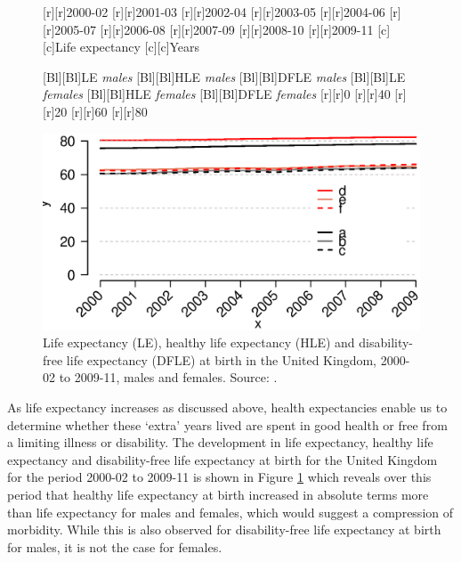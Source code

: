 \documentclass[11 pt, a4paper]{report}
\begin{document}
\begin{figure}[hbtp!]
[r][r]{\small{2000-02}}
[r][r]{\small{2001-03}}
[r][r]{\small{2002-04}}
[r][r]{\small{2003-05}}
[r][r]{\small{2004-06}}
[r][r]{\small{2005-07}}
[r][r]{\small{2006-08}}
[r][r]{\small{2007-09}}
[r][r]{\small{2008-10}}
[r][r]{\small{2009-11}}
[c][c]{\small{Life expectancy}}
[c][c]{\small{Years}}

[Bl][Bl]{\small{LE \emph{males}}}
[Bl][Bl]{\small{HLE \emph{males}}}
[Bl][Bl]{\small{DFLE \emph{males}}}
[Bl][Bl]{\small{LE \emph{females}}}
[Bl][Bl]{\small{HLE \emph{females}}}
[Bl][Bl]{\small{DFLE \emph{females}}}
[r][r]{\small{0}}
[r][r]{\small{40}}
[r][r]{\small{20}}
[r][r]{\small{60}}
[r][r]{\small{80}}

\includegraphics[width=\textwidth]{../figures/Fig3.1.eps}
\caption{Life expectancy (LE), healthy life expectancy (HLE) and disability-free life expectancy (DFLE) at birth in the United Kingdom, 2000-02 to 2009-11, males and females. Source: \cite{ONS2012}.}
\label{Fig:31}
\end{figure}



As life expectancy increases as discussed above, health expectancies enable us to determine whether these `extra' years lived are spent in good health or free from a limiting illness or disability. The development in life expectancy, healthy life expectancy and disability-free life expectancy at birth for the United Kingdom for the period 2000-02 to 2009-11 is shown in Figure \ref{Fig:31} which reveals over this period that healthy life expectancy at birth increased in absolute terms more than life expectancy for males and females, which would suggest a compression of morbidity. While this is also observed for disability-free life expectancy at birth for males, it is not the case for females.  
\end{document}
